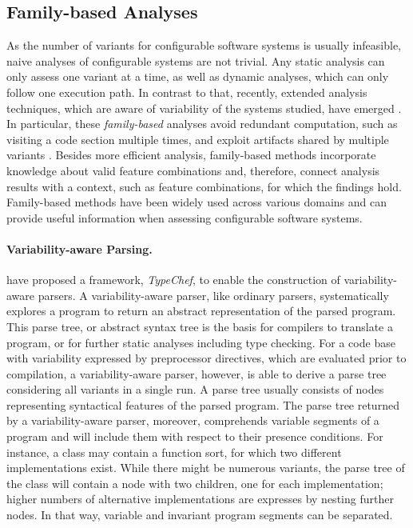 \subsection{Family-based Analyses}
As the number of variants for configurable software systems is usually
infeasible, naive analyses of configurable systems are not trivial. Any static
analysis can only assess one variant at a time, as well as dynamic analyses,
which can only follow one execution path. 
In contrast to that, recently,
extended analysis techniques, which are aware of variability of the systems
studied, have emerged \citep{thum_classification_2014}. In particular, these
\emph{family-based} analyses avoid redundant computation, such as visiting a
code section multiple times, and exploit artifacts shared by multiple variants \citep{thum_classification_2014}. Besides more
efficient analysis, family-based methods incorporate knowledge about valid
feature combinations \citep{thum_classification_2014} and, therefore, connect analysis results with
a context, such as feature combinations, for which the findings hold.
Family-based methods have been widely used across various domains and can
provide useful information when assessing configurable software systems.

\paragraph{Variability-aware Parsing.} \cite{kastner_variability-aware_2011}
have proposed a framework, \emph{TypeChef}, to enable the construction of variability-aware parsers. A variability-aware parser, like
ordinary parsers, systematically explores a program to return an abstract
representation of the parsed program. This parse tree, or abstract syntax tree
is the basis for compilers to translate a program, or for further static
analyses including type checking. For a code base with variability expressed by
preprocessor directives, which are evaluated prior to compilation, a
variability-aware parser, however, is able to derive a parse tree considering
all variants in a single run. A parse tree usually consists of nodes
representing syntactical features of the parsed program. The parse tree
returned by a variability-aware parser, moreover, comprehends variable segments
of a program and will include them with respect to their presence conditions.
For instance, a class may contain a function sort, for which two different
implementations exist. While there might be numerous variants, the parse tree
of the class will contain a node with two children, one for each
implementation; higher numbers of alternative implementations are expresses by
nesting further nodes. In that way, variable and invariant program segments
can be separated.


